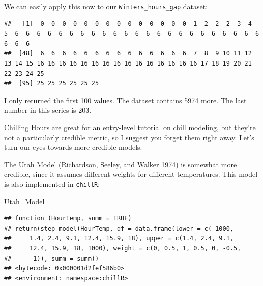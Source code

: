 \documentclass[
]{book}
\newenvironment{Shaded}{\begin{snugshade}}{\end{snugshade}}
\newcommand{\DecValTok}[1]{\textcolor[rgb]{0.00,0.00,0.81}{#1}}
\newcommand{\KeywordTok}[1]{\textcolor[rgb]{0.13,0.29,0.53}{\textbf{#1}}}
\newcommand{\NormalTok}[1]{#1}
\newcommand{\OperatorTok}[1]{\textcolor[rgb]{0.81,0.36,0.00}{\textbf{#1}}}
\begin{document}
We can easily apply this now to our \texttt{Winters\_hours\_gap} dataset:

\begin{Shaded}
\end{Shaded}

\begin{verbatim}
##   [1]  0  0  0  0  0  0  0  0  0  0  0  0  0  0  1  2  2  2  3  4  5  6  6  6  6  6  6  6  6  6  6  6  6  6  6  6  6  6  6  6  6  6  6  6  6  6  6
##  [48]  6  6  6  6  6  6  6  6  6  6  6  6  6  6  7  8  9 10 11 12 13 14 15 16 16 16 16 16 16 16 16 16 16 16 16 16 16 16 17 18 19 20 21 22 23 24 25
##  [95] 25 25 25 25 25 25
\end{verbatim}

I only returned the first 100 values. The dataset contains 5974 more. The last number in this series is 203.

Chilling Hours are great for an entry-level tutorial on chill modeling, but they're not a particularly credible metric, so I suggest you forget them right away. Let's turn our eyes towards more credible models.

The Utah Model (Richardson, Seeley, and Walker \protect\hyperlink{ref-richardson1974model}{1974}) is somewhat more credible, since it assumes different weights for different temperatures. This model is also implemented in \texttt{chillR}:

\begin{Shaded}
\begin{Highlighting}[]
\NormalTok{Utah_Model}
\end{Highlighting}
\end{Shaded}

\begin{verbatim}
## function (HourTemp, summ = TRUE) 
## return(step_model(HourTemp, df = data.frame(lower = c(-1000, 
##     1.4, 2.4, 9.1, 12.4, 15.9, 18), upper = c(1.4, 2.4, 9.1, 
##     12.4, 15.9, 18, 1000), weight = c(0, 0.5, 1, 0.5, 0, -0.5, 
##     -1)), summ = summ))
## <bytecode: 0x000001d2fef586b0>
## <environment: namespace:chillR>
\end{verbatim}

\begin{Shaded}
\end{Shaded}
\end{document}
